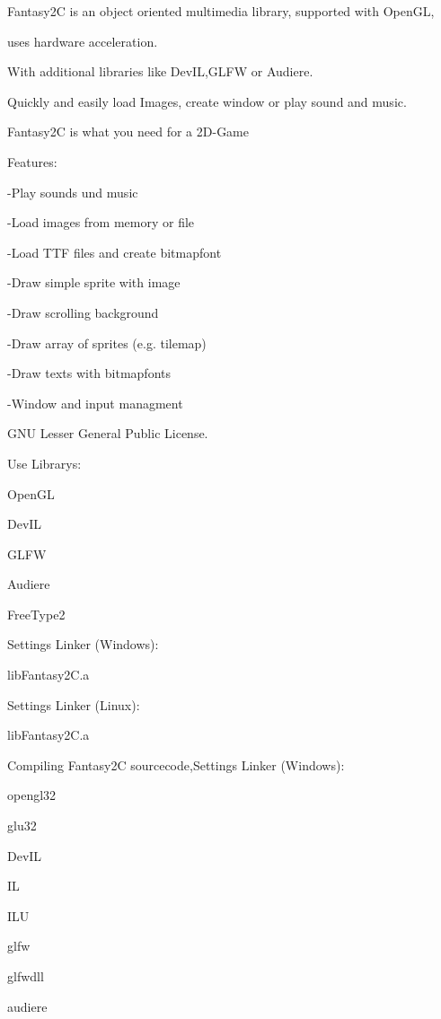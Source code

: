  Fantasy2C is an object oriented multimedia library, supported with OpenGL, \par
 uses hardware acceleration. \par
 With additional libraries like DevIL,GLFW or Audiere. \par
 Quickly and easily load Images, create window or play sound and music. \par
 Fantasy2C is what you need for a 2D-\/Game \par
 \par
 Features: \par
 -\/Play sounds und music\par
 -\/Load images from memory or file\par
 -\/Load TTF files and create bitmapfont\par
 -\/Draw simple sprite with image\par
 -\/Draw scrolling background\par
 -\/Draw array of sprites (e.g. tilemap)\par
 -\/Draw texts with bitmapfonts\par
 -\/Window and input managment\par
 \par
 GNU Lesser General Public License. \par
 \par
 Use Librarys: \par
 OpenGL \par
 DevIL \par
 GLFW \par
 Audiere \par
 FreeType2 \par
 \par
 Settings Linker (Windows): \par
 libFantasy2C.a \par
 \par
 Settings Linker (Linux): \par
 libFantasy2C.a \par
 \par
 Compiling Fantasy2C sourcecode,Settings Linker (Windows): \par
 opengl32 \par
 glu32 \par
 DevIL \par
 IL \par
 ILU \par
 glfw \par
 glfwdll \par
 audiere \par
